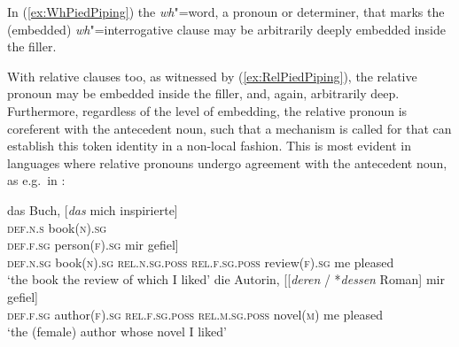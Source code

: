 \documentclass[output=paper,biblatex,babelshorthands,newtxmath,draftmode,colorlinks,citecolor=brown]{langscibook}
\begin{document}
\begin{exe}
  \ex \label{ex:RelPiedPiping}
  \begin{xlist}
  \end{xlist}
\end{exe}

\noindent
In (\ref{ex:WhPiedPiping}) the \emph{wh}"=word, a pronoun or determiner, that
marks the (embedded) \emph{wh}"=interrogative clause may be arbitrarily deeply embedded inside the filler.  

With relative clauses too, as witnessed by (\ref{ex:RelPiedPiping}), the
relative pronoun may be embedded inside the filler, and, again,
arbitrarily deep. Furthermore, regardless of the level of embedding,
the relative pronoun is coreferent with the antecedent noun, such that
a mechanism is called for that can establish this token identity in a
non-local fashion. This is most evident in languages where relative
pronouns undergo agreement with the antecedent noun, as e.g.\ in
:

\eal
\ex
\gll das Buch, [\textit{das} mich inspirierte]\\
     \textsc{def.n.s} book(\textsc{n})\textsc{.sg} \hphantom[\textsc{rel.n.sg} me inspired\\\hfill(\ili{German})
\glt `the book that inspired me'
\ex
\gll die Person, [\textit{die} mich inspirierte]\\
     \textsc{def.f.sg} person(\textsc{f})\textsc{.sg} \hphantom[\textsc{rel.f.sg} me inspired\\   
\glt `the person that inspired me'
\ex
\gll das Buch, [[\textit{dessen} / *\textit{deren} Rezension] mir gefiel]\\
     \textsc{def.n.sg} book(\textsc{n})\textsc{.sg} \hphantom{[[}\textsc{rel.n.sg.poss} {} \hphantom{*}\textsc{rel.f.sg.poss} review(\textsc{f}).\textsc{sg} me pleased\\
\glt `the book the review of which I liked'
\ex
\gll die Autorin, [[\textit{deren} / *\textit{dessen} Roman] mir gefiel]\\
     \textsc{def.f.sg} author(\textsc{f})\textsc{.sg} \hphantom{[[}\textsc{rel.f.sg.poss} {} \hphantom{*}\textsc{rel.m.sg.poss} novel(\textsc{m}) me pleased\\
\glt `the (female) author whose novel I liked'
\zl
\end{document}
